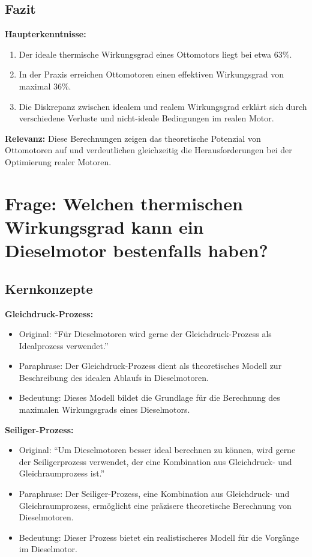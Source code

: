 \documentclass[a4paper,12pt]{article}
\begin{document}
\subsection{Fazit}

\textbf{Haupterkenntnisse:}

\begin{enumerate}
    \item Der ideale thermische Wirkungsgrad eines Ottomotors liegt bei etwa 63\%.
    \item In der Praxis erreichen Ottomotoren einen effektiven Wirkungsgrad von maximal 36\%.
    \item Die Diskrepanz zwischen idealem und realem Wirkungsgrad erklärt sich durch verschiedene Verluste und nicht-ideale Bedingungen im realen Motor.
\end{enumerate}

\textbf{Relevanz:} Diese Berechnungen zeigen das theoretische Potenzial von Ottomotoren auf und verdeutlichen gleichzeitig die Herausforderungen bei der Optimierung realer Motoren.


\section{Frage: Welchen thermischen Wirkungsgrad kann ein Dieselmotor bestenfalls haben?}

\subsection{Kernkonzepte}

\textbf{Gleichdruck-Prozess:}

\begin{itemize}
    \item Original: \enquote{Für Dieselmotoren wird gerne der Gleichdruck-Prozess als Idealprozess verwendet.}
    \item Paraphrase: Der Gleichdruck-Prozess dient als theoretisches Modell zur Beschreibung des idealen Ablaufs in Dieselmotoren.
    \item Bedeutung: Dieses Modell bildet die Grundlage für die Berechnung des maximalen Wirkungsgrads eines Dieselmotors.
\end{itemize}

\textbf{Seiliger-Prozess:}

\begin{itemize}
    \item Original: \enquote{Um Dieselmotoren besser ideal berechnen zu können, wird gerne der Seiligerprozess verwendet, der eine Kombination aus Gleichdruck- und Gleichraumprozess ist.}
    \item Paraphrase: Der Seiliger-Prozess, eine Kombination aus Gleichdruck- und Gleichraumprozess, ermöglicht eine präzisere theoretische Berechnung von Dieselmotoren.
    \item Bedeutung: Dieser Prozess bietet ein realistischeres Modell für die Vorgänge im Dieselmotor.
\end{itemize}
\end{document}
